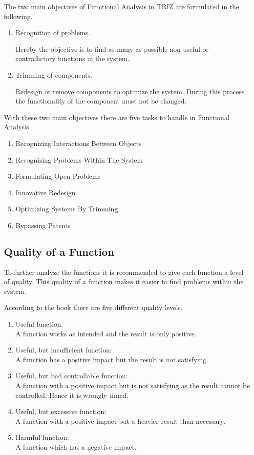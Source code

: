 \documentclass[11pt,a4paper]{article}
\begin{document}
The two main objectives of Functional Analysis in TRIZ are formulated in the
following.
\begin{enumerate}
\item Recognition of problems.
  
  Hereby the objective is to find as many as possible non-useful or
  contradictory functions in the system.
\item Trimming of components.
  
  Redesign or remove components to optimize the system.  During this process
  the functionality of the component must not be changed.
\end{enumerate}

With these two main objectives there are five tasks to handle in Functional
Analysis.
\begin{enumerate}
\item Recognizing Interactions Between Objects
\item Recognizing Problems Within The System
\item Formulating Open Problems
\item Innovative Redesign
\item Optimizing Systems By Trimming
\item Bypassing Patents
\end{enumerate}

\subsection{Quality of a Function}

To further analyze the functions it is recommended to give each function a
level of quality.  This quality of a function makes it easier to find problems
within the system.

According to the book there are five different quality levels.

\begin{enumerate}
\item Useful function: \\  
  A function works as intended and the result is only positive.
\item Useful, but insufficient function: \\
  A function has a positive impact but the result is not satisfying.
\item Useful, but bad controllable function: \\
  A function with a positive impact but is not satisfying as the result cannot
  be controlled.  Hence it is wrongly timed.
\item Useful, but excessive function: \\
  A function with a positive impact but a heavier result than necessary.
\item Harmful function: \\
  A function which has a negative impact.
\end{enumerate}
\end{document}
